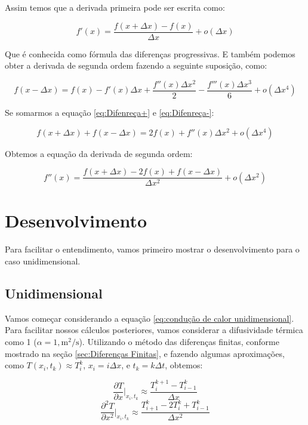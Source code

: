 \documentclass[final,5p,times,twocolumn]{elsarticle}
\begin{document}
Assim temos que a derivada primeira pode ser escrita como:

\begin{equation*}
    f'(x) = \frac{f(x+\Delta x) - f(x)}{\Delta x} + o(\Delta x)
\end{equation*}

Que é conhecida como fórmula das diferenças progressivas. E também podemos obter a derivada de segunda ordem fazendo a seguinte suposição, como:

\begin{equation}
\label{eq:Difenreça-}
    f(x-\Delta x) = f(x) - f'(x)\Delta x + \frac{f''(x)\Delta x^2}{2} - \frac{f'''(x)\Delta x^3}{6} + o(\Delta x^4)
\end{equation}

Se somarmos a equação \ref{eq:Difenreça+} e \ref{eq:Difenreça-}:

\begin{equation*}
    f(x+\Delta x) + f(x-\Delta x) = 2f(x)+f''(x)\Delta x^2 + o(\Delta x^4)
\end{equation*}

Obtemos a equação da derivada de segunda ordem:

\begin{equation}
\label{eq:DiferençaSegundaOrdem}
    f''(x)=\frac{f(x+\Delta x) - 2f(x) + f(x-\Delta x)}{\Delta x^2} + o(\Delta x^2)
\end{equation}
\section{Desenvolvimento}

Para facilitar o entendimento, vamos primeiro mostrar o desenvolvimento para o caso unidimensional.

\subsection{Unidimensional}
\label{sec:Unidimensional}
Vamos começar considerando a equação \ref{eq:condução de calor unidimensional}. Para facilitar nossos cálculos posteriores, vamos considerar a difusividade térmica como 1 ($\alpha = 1 , \text{m}^2/\text{s}$). Utilizando o método das diferenças finitas, conforme mostrado na seção \ref{sec:Diferenças Finitas}, e fazendo algumas aproximações, como $T(x_i,t_k) \approx T_i^k$, $x_i = i\Delta x$, e $t_k = k\Delta t$, obtemos:

\begin{equation}
\label{eq:AproximaçãoTempo}
    \frac{\partial T}{\partial x}|_{x_i,t_k} \approx \frac{T_i^{k+1}-T_{i-1}^k}{\Delta x}
\end{equation}
\begin{equation}
\label{eq:AproximaçãoEspaço}
    \frac{\partial^2T}{\partial x^2}|_{x_i,t_k} \approx \frac{T_{i+1}^k - 2T_i^k + T_{i-1}^k}{\Delta x^2}
\end{equation}
\end{document}
